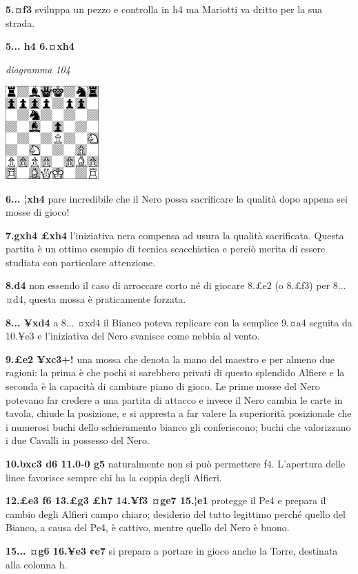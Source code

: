 \documentclass[
]{article}
\begin{document}
\textbf{5.¤f3} sviluppa un pezzo e controlla in h4 ma Mariotti va dritto
per la sua strada.

\textbf{5... h4 6.¤xh4}

\emph{diagramma 104}

\includegraphics[width=1.40139in,height=1.40139in]{vertopal_109f12be458a423d8f3cc838880eaea2/media/image104.png}

\textbf{6... ¦xh4} pare incredibile che il Nero possa sacrificare la
qualità dopo appena sei mosse di gioco!

\textbf{7.gxh4 £xh4} l'iniziativa nera compensa ad usura la qualità
sacrificata. Questa partita è un ottimo esempio di tecnica scacchistica
e perciò merita di essere studiata con particolare attenzione.

\textbf{8.d4} non essendo il caso di arroccare corto né di giocare 8.£e2
(o 8.£f3) per 8... ¤d4, questa mossa è praticamente forzata.

\textbf{8... ¥xd4} a 8... ¤xd4 il Bianco poteva replicare con la
semplice 9.¤a4 seguita da 10.¥e3 e l'iniziativa del Nero svanisce come
nebbia al vento.

\textbf{9.£e2 ¥xc3+!} una mossa che denota la mano del maestro e per
almeno due ragioni: la prima è che pochi si sarebbero privati di questo
splendido Alfiere e la seconda è la capacità di cambiare piano di gioco.
Le prime mosse del Nero potevano far credere a una partita di attacco e
invece il Nero cambia le carte in tavola, chiude la posizione, e si
appresta a far valere la superiorità posizionale che i numerosi buchi
dello schieramento bianco gli conferiscono; buchi che valorizzano i due
Cavalli in possesso del Nero.

\textbf{10.bxc3 d6 11.0-0 g5} naturalmente non si può permettere f4.
L'apertura delle linee favorisce sempre chi ha la coppia degli Alfieri.

\textbf{12.£e3 f6 13.£g3 £h7 14.¥f3 ¤ge7 15.¦e1} protegge il Pe4 e
prepara il cambio degli Alfieri campo chiaro; desiderio del tutto
legittimo perché quello del Bianco, a causa del Pe4, è cattivo, mentre
quello del Nero è buono.

\textbf{15... ¤g6 16.¥e3 ¢e7} si prepara a portare in gioco anche la
Torre, destinata alla colonna h.
\end{document}
